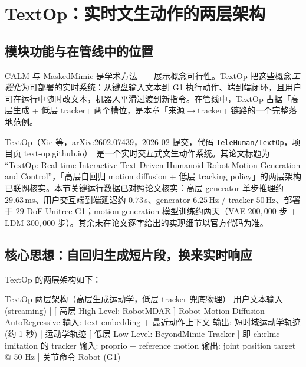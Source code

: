 \section{TextOp：实时文生动作的两层架构}
\label{sec:rlmc-mm-textop}

\subsection{模块功能与在管线中的位置}
\label{sec:rlmc-mm-textop-pos}

CALM 与 MaskedMimic 是学术方法——展示概念可行性。TextOp 把这些概念\emph{工程化}为可部署的实时系统：从键盘输入文本到 G1 执行动作、端到端闭环，且用户可在运行中随时改文本，机器人平滑过渡到新指令。在管线中，TextOp 占据「高层生成 + 低层 tracker」两个槽位，是本章「来源$\to$tracker」链路的一个完整落地范例。

\begin{note}
TextOp（Xie 等，arXiv:2602.07439，2026-02 提交，代码 \texttt{TeleHuman/\allowbreak TextOp}，项目页 text-op.github.io）\,\cite{xie2026textop} 是一个实时交互式文生动作系统。其论文标题为 ``TextOp: Real-time Interactive Text-Driven Humanoid Robot Motion Generation and Control''，「高层自回归 motion diffusion + 低层 tracking policy」的两层架构已联网核实。本节关键运行数据已对照论文核实：高层 generator 单步推理约 $29.63$\,ms、用户交互端到端延迟约 $0.73$\,s、generator $6.25$\,Hz / tracker $50$\,Hz、部署于 $29$-DoF Unitree G1；motion generation 模型训练约两天（VAE $200{,}000$ 步 + LDM $300{,}000$ 步）。其余未在论文逐字给出的实现细节以官方代码为准。
\end{note}

\subsection{核心思想：自回归生成短片段，换来实时响应}
\label{sec:rlmc-mm-textop-arch}

TextOp 的两层架构如下：

\begin{codebox}{TextOp 两层架构（高层生成运动学，低层 tracker 兜底物理）}
用户文本输入 (streaming)
   |
[ 高层 High-Level: RobotMDAR ]  Robot Motion Diffusion AutoRegressive
   输入: text embedding + 最近动作上下文
   输出: 短时域运动学轨迹 (约 1 秒)
   |  运动学轨迹
[ 低层 Low-Level: BeyondMimic Tracker ]  即 ch:rlmc-imitation 的 tracker
   输入: proprio + reference motion
   输出: joint position target @ 50 Hz
   |  关节命令
Robot (G1)
\end{codebox}

